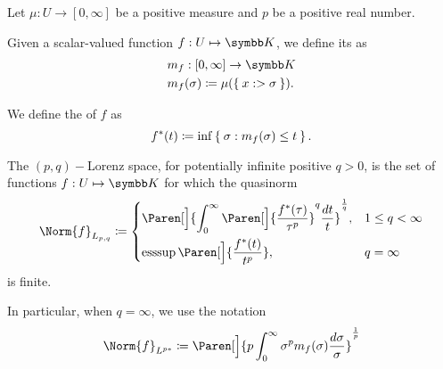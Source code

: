 \begin{definition}\label{def:distribution_function}\cite[6]{Bergh1976}
  Let \( \mu: U \to [0, \infty] \) be a positive measure and \( p \) be a positive real number.

  \begin{DefEnum}
     Given a scalar-valued function \( f: U \mapsto \BK \), we define its  as
    \begin{align*}
      &m_f: [0, \infty] \to \BK \\
      &m_f(\sigma) \coloneqq \mu(\Set{ x :  > \sigma }).
    \end{align*}

     We define the  of \( f \) as
    \begin{equation*}
      f^*(t) \coloneqq \inf\Set{ \sigma : m_f(\sigma) \leq t }.
    \end{equation*}

     The \( (p, q)-\)Lorenz space, for potentially infinite positive \( q > 0 \), is the set of functions \( f: U \mapsto \BK \) for which the quasinorm
    \begin{equation*}
      \Norm{f}_{L_{p,q}} \coloneqq \begin{dcases}
        \Paren[\Big]{\int_0^\infty \Paren[\Big]{\frac {f^*(\tau)} {\tau^p}}^q \frac {d t} t}^{\frac 1 q}, &1 \leq q < \infty \\
        \Ess\sup\Paren[\Big]{\frac {f^*(t)} {t^p}}, &q = \infty
      \end{dcases}
    \end{equation*}
    is finite.

    In particular, when \( q = \infty \), we use the notation
    \begin{equation*}
      \Norm{f}_{L^{p*}} \coloneqq \Paren[\Big]{p \int_0^\infty \sigma^p m_f(\sigma) \frac {d \sigma} \sigma}^{\frac 1 p}
    \end{equation*}
  \end{DefEnum}
\end{definition}

